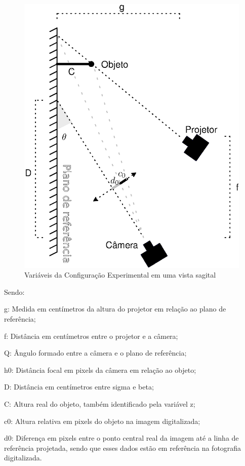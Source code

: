 \documentclass[a4paper, 12pt]{article}
\begin{document}
\begin{figure}[H]
	\centering
		\includegraphics[scale=0.5]{vista_sagital.eps}
	\caption{Variáveis da Configuração Experimental em uma vista sagital}
	\label{setup com as variaveis}
\end{figure}

Sendo:

g: Medida em centímetros da altura do projetor em relação ao plano de referência;

f:  Distância em centímetros entre o projetor e a câmera;	          

Q: Ângulo formado entre a câmera e o plano de referência;

h0: Distância focal em pixels da câmera em relação ao objeto;  

D:  Distância em centímetros entre sigma e beta;

C: Altura real do objeto, também identificado pela variável z;

c0: Altura relativa em pixels do objeto na imagem digitalizada;

d0: Diferença em pixels entre o ponto central real da imagem até a linha de referência projetada, sendo que esses dados estão em referência na fotografia digitalizada. 
 
\end{document}
